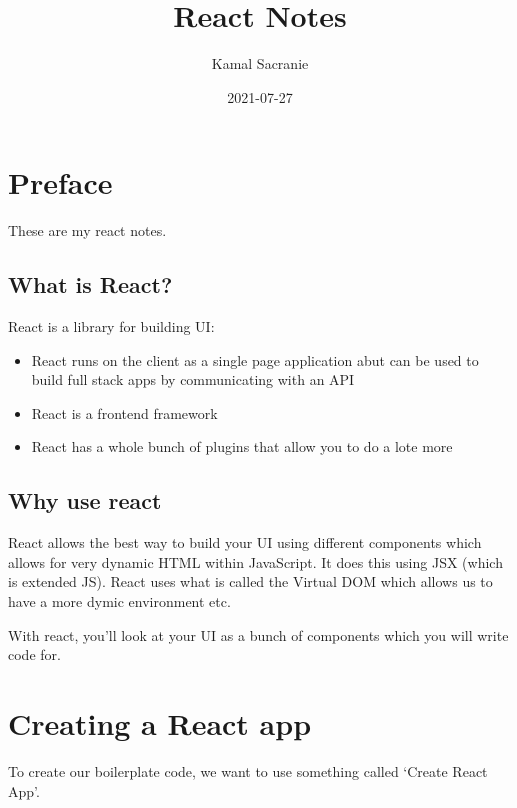 \documentclass[
]{report}
\title{React Notes}
\author{Kamal Sacranie}
\date{2021-07-27}
\providecommand{\tightlist}{%
  \setlength{\itemsep}{0pt}\setlength{\parskip}{0pt}}
\theoremstyle{definition}
\theoremstyle{definition}
\theoremstyle{definition}
\theoremstyle{definition}
\theoremstyle{remark}
\begin{document}
\maketitle

{
\setcounter{tocdepth}{1}
\tableofcontents
}
\hypertarget{preface}{%
\chapter*{Preface}\label{preface}}

These are my react notes.

\hypertarget{what-is-react}{%
\section{What is React?}\label{what-is-react}}

React is a library for building UI:

\begin{itemize}
\tightlist
\item
  React runs on the client as a single page application abut can be used to
  build full stack apps by communicating with an API
\item
  React is a frontend framework
\item
  React has a whole bunch of plugins that allow you to do a lote more
\end{itemize}

\hypertarget{why-use-react}{%
\section{Why use react}\label{why-use-react}}

React allows the best way to build your UI using different components which
allows for very dynamic HTML within JavaScript. It does this using JSX (which
is extended JS). React uses what is called the Virtual DOM which allows us to
have a more dymic environment etc.

With react, you'll look at your UI as a bunch of components which you will
write code for.

\hypertarget{creating-a-react-app}{%
\chapter{Creating a React app}\label{creating-a-react-app}}

To create our boilerplate code, we want to use something called `Create React App'.
\end{document}
